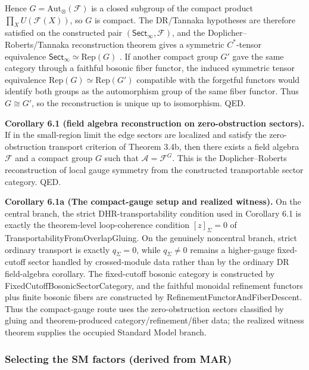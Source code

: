 Hence \(G=\mathrm{Aut}_\otimes(\mathcal F)\) is a closed subgroup of the compact product \(\prod_X U(\mathcal F(X))\), so \(G\) is compact. The DR/Tannaka hypotheses are therefore satisfied on the constructed pair \((\mathsf{Sect}_\infty,\mathcal F)\), and the Doplicher--Roberts/Tannaka reconstruction theorem gives a symmetric \(C^*\)-tensor equivalence \(\mathsf{Sect}_\infty \simeq \mathrm{Rep}(G)\) \cite{dr89,dr90}. If another compact group \(G'\) gave the same category through a faithful bosonic fiber functor, the induced symmetric tensor equivalence \(\mathrm{Rep}(G)\simeq\mathrm{Rep}(G')\) compatible with the forgetful functors would identify both groups as the automorphism group of the same fiber functor. Thus \(G\cong G'\), so the reconstruction is unique up to isomorphism. QED.

\textbf{Corollary 6.1 (field algebra reconstruction on zero-obstruction sectors).} If in the small-region limit the edge sectors are localized and satisfy the zero-obstruction transport criterion of Theorem 3.4b, then there exists a field algebra \(\mathcal F\) and a compact group \(G\) such that \(\mathcal A = \mathcal F^G\). This is the Doplicher--Roberts reconstruction of local gauge symmetry from the constructed transportable sector category. QED.

\textbf{Corollary 6.1a (The compact-gauge setup and realized witness).} On the central branch, the strict DHR-transportability condition used in Corollary 6.1 is exactly the theorem-level loop-coherence condition \([z]_\Sigma=0\) of TransportabilityFromOverlapGluing. On the genuinely noncentral branch, strict ordinary transport is exactly \(q_\Sigma=0\), while \(q_\Sigma\ne0\) remains a higher-gauge fixed-cutoff sector handled by crossed-module data rather than by the ordinary DR field-algebra corollary. The fixed-cutoff bosonic category is constructed by FixedCutoffBosonicSectorCategory, and the faithful monoidal refinement functors plus finite bosonic fibers are constructed by RefinementFunctorAndFiberDescent. Thus the compact-gauge route uses the zero-obstruction sectors classified by gluing and theorem-produced category/refinement/fiber data; the realized witness theorem supplies the occupied Standard Model branch.

\subsubsection{Selecting the SM factors (derived from MAR)}\label{62-selecting-the-sm-factors-derived-from-mar}

